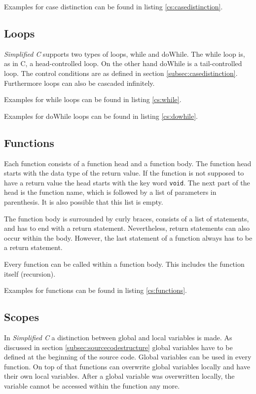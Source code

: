 \documentclass[12pt,a4paper,titlepage,oneside,final]{article}
\begin{document}
Examples for case distinction can be found in listing \vref{cs:casedistinction}.



\subsection{Loops}
\emph{Simplified C} supports two types of loops, while and doWhile. The while loop is, as in C, a head-controlled loop. On the other hand doWhile is a tail-controlled loop. The control conditions are as defined in section \vref{subsec:casedistinction}. Furthermore loops can also be cascaded infinitely.


Examples for while loops can be found in listing \vref{cs:while}.



Examples for doWhile loops can be found in listing \vref{cs:dowhile}.



\subsection{Functions}
Each function consists of a function head and a function body. The function head starts with the data type of the return value. If the function is not supposed to have a return value the head starts with the key word \texttt{void}. The next part of the head is the function name, which is followed by a list of parameters in parenthesis. It is also possible that this list is empty.

The function body is surrounded by curly braces, consists of a list of statements, and has to end with a return statement. Nevertheless, return statements can also occur within the body. However, the last statement of a function always has to be a return statement.

Every function can be called within a function body. This includes the function itself (recursion).


Examples for functions can be found in listing \vref{cs:functions}.



\subsection{Scopes}
In \emph{Simplified C} a distinction between global and local variables is made. As discussed in section \vref{subsec:sourcecodestructure} global variables have to be defined at the beginning of the source code. Global variables can be used in every function. On top of that functions can overwrite global variables locally and have their own local variables. After a global variable was overwritten locally, the variable cannot be accessed within the function any more.
\end{document}
